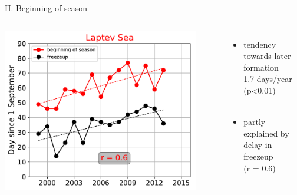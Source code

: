 \documentclass[8pt]{beamer}
\begin{document}
\setwatermark{\fontsize{125pt}{125pt}\selectfont{}}
\begin{frame}[fragile]{II. Beginning of season}
	\begin{columns}
		\includegraphics[width=0.9\textwidth]{./img/Beginning_frzp_LS.pdf}\\~\\
		\begin{itemize}
			\item{tendency towards later formation \\ 1.7 days/year (p\textless0.01)}\\~\\
			\item{partly explained by delay in freezeup\\ (r = 0.6)}
		\end{itemize}
	\end{columns}
\end{frame}
\end{document}
